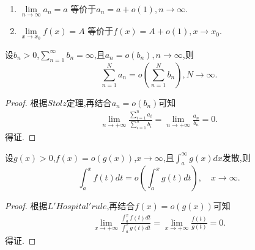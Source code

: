 \documentclass[lang=cn,newtx,10pt,scheme=chinese]{elegantbook}
\begin{document}
\begin{proposition}[极限的等价定义]\label{proposition:极限的等价定义(用o余项定义极限)}
\begin{enumerate}
\item $\underset{n\rightarrow \infty}{\lim}a_n=a$
等价于$a_n=a+o\left( 1 \right) ,n\rightarrow \infty$.

\item $\underset{x\rightarrow x_0}{\lim}f\left( x \right) =A$
等价于$f\left( x \right) =A+o\left( 1 \right) ,x\rightarrow x_0$.
\end{enumerate}

\end{proposition}

\begin{theorem}\label{theorem:发散级数的求和号与o可交换}
    设\(b_n>0\),\(\sum_{n = 1}^{\infty}b_n=\infty\),且\(a_n = o(b_n),n\to\infty\),则
\[
\sum_{n = 1}^{N}a_n=o\left(\sum_{n = 1}^{N}b_n\right),N\to\infty.
\]
\end{theorem}
\begin{proof}
    根据$Stolz$定理,再结合$a_n=o\left( b_n \right)$可知
    \begin{align*}
        \underset{n\rightarrow +\infty}{\lim}\frac{\sum\limits_{i=1}^n{a_i}}{\sum\limits_{i=1}^n{b_i}}=\underset{n\rightarrow +\infty}{\lim}\frac{a_n}{b_n}=0.
    \end{align*}得证.
\end{proof}

\begin{theorem}\label{theorem:发散积分的积分号与o可交换}
   设\(g(x)>0\),\(f(x)=o(g(x))\),\(x\to\infty\),且\(\int_{a}^{\infty}g(x)dx\)发散,则
\[
\int_{a}^{x}f(t)dt = o\left(\int_{a}^{x}g(t)dt\right),\quad x\to\infty.
\]
\end{theorem}
\begin{proof}
    根据$L'Hospital'rule$,再结合$f(x)=o(g(x))$可知
    \begin{align*}
        \underset{x\rightarrow +\infty}{\lim}\frac{\int_a^x{f\left( t \right) dt}}{\int_a^x{g\left( t \right) dt}}=\underset{x\rightarrow +\infty}{\lim}\frac{f\left( t \right)}{g\left( t \right)}=0.
    \end{align*}得证.
\end{proof}
\end{document}
